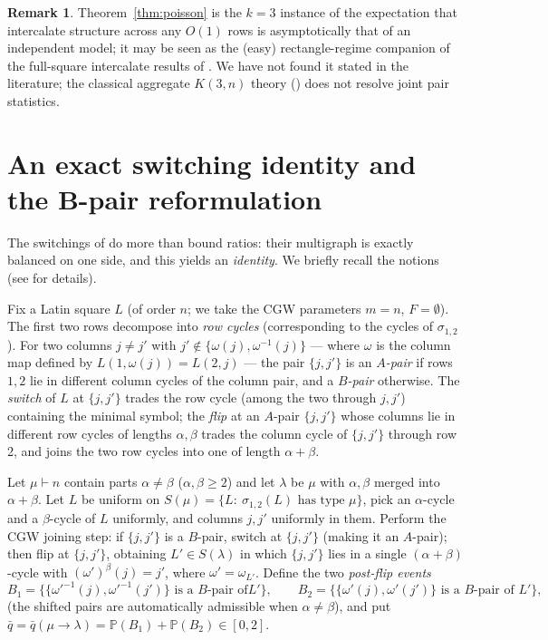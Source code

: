 \documentclass[11pt]{article}
\theoremstyle{definition}
\newtheorem{remark}[theorem]{Remark}
\renewcommand{\Pr}{\mathbb{P}}
\begin{document}
\begin{remark}
Theorem~\ref{thm:poisson} is the $k=3$ instance of the expectation that
intercalate structure across any $O(1)$ rows is asymptotically that of an
independent model; it may be seen as the (easy) rectangle-regime companion
of the full-square intercalate results of \cite{KSSS22}.  We have not found
it stated in the literature; the classical aggregate $K(3,n)$ theory
(\cite[Ch.~8 \S4]{Riordan58}) does not resolve joint pair statistics.
\end{remark}


\section{An exact switching identity and the B-pair reformulation}\label{sec:identity}

The switchings of \cite{CGW08} do more than bound ratios: their multigraph
is exactly balanced on one side, and this yields an \emph{identity}.  We
briefly recall the notions (see \cite[\S2--3]{CGW08} for details).

Fix a Latin square $L$ (of order $n$; we take the CGW parameters $m=n$,
$F=\emptyset$).  The first two rows decompose into \emph{row cycles}
(corresponding to the cycles of $\sigma_{1,2}$).  For two columns $j\ne j'$
with $j'\notin\{\omega(j),\omega^{-1}(j)\}$ --- where $\omega$ is the column
map defined by $L(1,\omega(j))=L(2,j)$ --- the pair $\{j,j'\}$ is an
\emph{$A$-pair} if rows $1,2$ lie in different column cycles of the column
pair, and a \emph{$B$-pair} otherwise.  The \emph{switch} of $L$ at
$\{j,j'\}$ trades the row cycle (among the two through $j,j'$) containing
the minimal symbol; the \emph{flip} at an $A$-pair $\{j,j'\}$ whose columns
lie in different row cycles of lengths $\alpha,\beta$ trades the column
cycle of $\{j,j'\}$ through row 2, and joins the two row cycles into one of
length $\alpha+\beta$.

Let $\mu\vdash n$ contain parts $\alpha\neq\beta$ ($\alpha,\beta\ge2$) and
let $\lambda$ be $\mu$ with $\alpha,\beta$ merged into $\alpha+\beta$.  Let
$L$ be uniform on $S(\mu)=\{L:\ \sigma_{1,2}(L)\text{ has type }\mu\}$,
pick an $\alpha$-cycle and a $\beta$-cycle of $L$ uniformly, and columns
$j,j'$ uniformly in them.  Perform the CGW joining step:
if $\{j,j'\}$ is a $B$-pair, switch at $\{j,j'\}$ (making it an $A$-pair);
then flip at $\{j,j'\}$, obtaining $L'\in S(\lambda)$ in which $\{j,j'\}$
lies in a single $(\alpha+\beta)$-cycle with
$(\omega')^{\beta}(j)=j'$, where $\omega'=\omega_{L'}$.  Define the two
\emph{post-flip events}
\[
B_1=\bigl\{\{\omega'^{-1}(j),\omega'^{-1}(j')\}\text{ is a $B$-pair of
}L'\bigr\},
\qquad
B_2=\bigl\{\{\omega'(j),\omega'(j')\}\text{ is a $B$-pair of }L'\bigr\},
\]
(the shifted pairs are automatically admissible when $\alpha\ne\beta$), and
put $\bar q=\bar q(\mu\to\lambda)=\Pr(B_1)+\Pr(B_2)\in[0,2]$.
\end{document}

